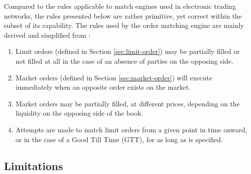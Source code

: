 Compared to the rules applicable to match engines used in electronic trading networks, the rules presented below are rather primitive, yet correct within the subset of its capability.
The rules used by the order matching engine are mainly derived and simplified from \cite{match-engine}:
\begin{enumerate}
    \item Limit orders (defined in Section \ref{sec:limit-order}) may be partially filled or not filled at all in the case of an absence of parties on the opposing side.
    
    \item Market orders (defined in Section \ref{sec:market-order}) will execute immediately when an opposite order exists on the market.
    
    \item Market orders may be partially filled, at different prices, depending on the liquidity on the opposing side of the book.
    
    \item Attempts are made to match limit orders from a given point in time onward, or in the case of a Good Till Time (GTT), for as long as is specified.
\end{enumerate}


\subsection{Limitations}

